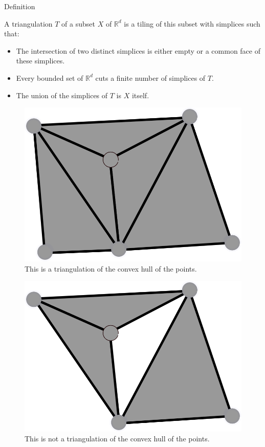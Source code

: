 \documentclass[18pt]{beamer}
\begin{document}
\begin{frame}{Definition}

 A triangulation $T$ of a subset $X$ of $\mathbb{R}^d$ is a tiling of this subset with simplices such
that:
\begin{itemize}
 \item<2-> The intersection of two distinct simplices is either empty or a common face of these simplices.
 \item<3-> Every bounded set of $\mathbb{R}^d$ cuts a finite number of simplices of $T$.
 \item<4-> The union of the simplices of $T$ is $X$ itself.
\end{itemize}

\begin{overprint}
\begin{figure}
  \centering
  \includegraphics[scale=1.5]{Trig1}
  \caption{\label{Trig1} This is a triangulation of the convex hull of the points.}
\end{figure}

\begin{figure}
  \centering
  \includegraphics[scale=1.5]{NotTrig1}
  \caption{\label{NotTrig1} This is not a triangulation of the convex hull of the points.}
\end{figure}


\end{overprint}
\end{frame}
\end{document}

